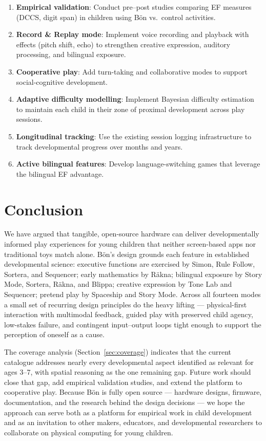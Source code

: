 \documentclass[12pt, a4paper]{article}
\newcommand{\Bodn}{B\"o\dh{}n}
\begin{document}
\begin{enumerate}
  \item \textbf{Empirical validation}: Conduct pre--post studies comparing
    EF measures (DCCS, digit span) in children using \Bodn{} vs.\ control
    activities.
  \item \textbf{Record \& Replay mode}: Implement voice recording and playback
    with effects (pitch shift, echo) to strengthen creative expression,
    auditory processing, and bilingual exposure.
  \item \textbf{Cooperative play}: Add turn-taking and collaborative modes to
    support social-cognitive development.
  \item \textbf{Adaptive difficulty modelling}: Implement Bayesian difficulty
    estimation to maintain each child in their zone of proximal development
    across play sessions.
  \item \textbf{Longitudinal tracking}: Use the existing session logging
    infrastructure to track developmental progress over months and years.
  \item \textbf{Active bilingual features}: Develop language-switching games
    that leverage the bilingual EF advantage.
\end{enumerate}

\section{Conclusion}
\label{sec:conclusion}

We have argued that tangible, open-source hardware can deliver developmentally
informed play experiences for young children that neither screen-based apps
nor traditional toys match alone. \Bodn{}'s design grounds each feature in
established developmental science: executive functions are exercised by Simon,
Rule Follow, Sortera, and Sequencer; early mathematics by R\"akna; bilingual
exposure by Story Mode, Sortera, R\"akna, and Blippa; creative expression by
Tone Lab and Sequencer; pretend play by Spaceship and Story Mode. Across all
fourteen modes a small set of recurring design principles do the heavy lifting
--- physical-first interaction with multimodal feedback, guided play with
preserved child agency, low-stakes failure, and contingent input--output loops
tight enough to support the perception of oneself as a cause.

The coverage analysis (Section~\ref{sec:coverage}) indicates that the current
catalogue addresses nearly every developmental aspect identified as relevant
for ages 3--7, with spatial reasoning as the one remaining gap. Future work
should close that gap, add empirical validation studies, and extend the
platform to cooperative play. Because \Bodn{} is fully open source --- hardware
designs, firmware, documentation, and the research behind the design decisions
--- we hope the approach can serve both as a platform for empirical work in
child development and as an invitation to other makers, educators, and
developmental researchers to collaborate on physical computing for young
children.


\end{document}

